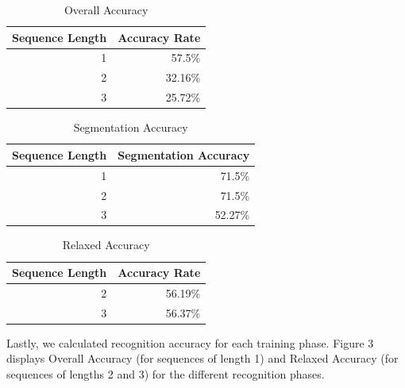 \documentclass[twoside]{article}
\begin{document}
\begin{multicols}{2}
\begin{table}[H]
  \centering
  \caption{Overall Accuracy}
    \begin{tabular}{rr}
    \toprule
    Sequence Length & Accuracy Rate \\
    \midrule
    1     & 57.5\% \\
    2     & 32.16\% \\
    3     & 25.72\% \\
    \bottomrule
    \end{tabular}%
  \label{tab:addlabel}%
\end{table}%

\begin{table}[H]
  \centering
  \caption{Segmentation Accuracy}
    \begin{tabular}{rr}
    \toprule
	Sequence Length & Segmentation Accuracy \\
    \midrule
    1     & 71.5\% \\
    2     & 71.5\% \\
    3     & 52.27\% \\
    \bottomrule
    \end{tabular}%
  \label{tab:addlabel}%
\end{table}%

\begin{table}[H]
  \centering
  \caption{Relaxed Accuracy}
    \begin{tabular}{rr}
    \toprule
    Sequence Length & Accuracy Rate \\
    \midrule
    2     & 56.19\% \\
    3     & 56.37\% \\
    \bottomrule
    \end{tabular}%
  \label{tab:addlabel}%
\end{table}%

Lastly, we calculated recognition accuracy for each training phase. Figure 3
displays Overall Accuracy (for sequences of length 1) and Relaxed Accuracy (for
sequences of lengths 2 and 3) for the different recognition phases.

\begin{figure}[H]
\centering
{}
\end{figure}
\end{multicols}
\end{document}
